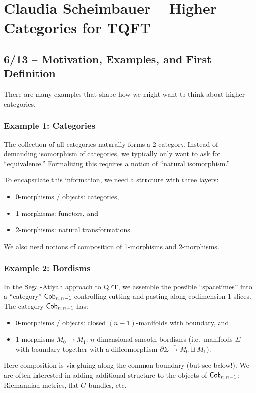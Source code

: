 \chapter{Claudia Scheimbauer -- Higher Categories for TQFT}

\section{6/13 -- Motivation, Examples, and First Definition}

There are many examples that shape how we might want to think about higher categories.

\subsection{Example 1: Categories}

The collection of all categories naturally forms a 2-category.
Instead of demanding isomorphism of categories, we typically only want to ask for ``equivalence.''
Formalizing this requires a notion of ``natural isomorphism.''

To encapsulate this information, we need a structure with three layers:
\begin{itemize}
	\item 0-morphisms / objects: categories,
	\item 1-morphisms: functors, and
	\item 2-morphisms: natural transformations.
\end{itemize}
We also need notions of composition of 1-morphisms and 2-morphisms.

\subsection{Example 2: Bordisms}

In the Segal-Atiyah approach to QFT, we assemble the possible ``spacetimes'' into a ``category'' $\mathsf{Cob}_{n,n-1}$ controlling cutting and pasting along codimension 1 slices.
The category $\mathsf{Cob}_{n,n-1}$ has:
\begin{itemize}
	\item 0-morphisms / objects: closed $(n-1)$-manifolds with boundary, and
	\item 1-morphisms $M_0 \to M_1$: $n$-dimensional smooth bordisms (i.e.\ manifolds $\Sigma$ with boundary together with a diffeomorphism $\partial \Sigma \xrightarrow{\sim} M_0 \sqcup M_1$).
\end{itemize}
Here composition is via gluing along the common boundary (but see below!).
We are often interested in adding additional structure to the objects of $\mathsf{Cob}_{n,n-1}$: Riemannian metrics, flat $G$-bundles, etc.


